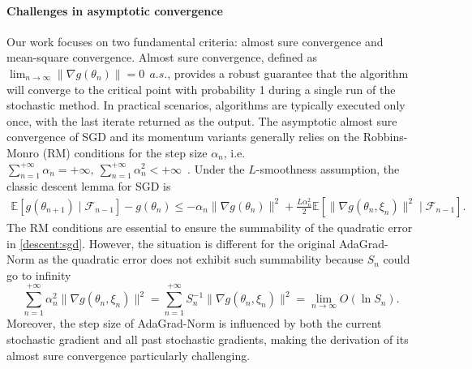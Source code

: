 \documentclass[standalone]{article}
\newcommand{\E}{\mathbb{E}}
\begin{document}
\paragraph{\textbf{Challenges in asymptotic convergence}} Our work focuses on two fundamental criteria: almost sure convergence and mean-square convergence. Almost sure convergence, defined as $\lim_{n \rightarrow \infty} \left\|\nabla g(\theta_n) \right\|=0 \ \  a.s.$, provides a robust guarantee that the algorithm will converge to the critical point with probability 1 during a single run of the stochastic method. In practical scenarios, algorithms are typically executed only once, with the last iterate returned as the output. The asymptotic almost sure convergence of SGD and its momentum variants generally relies on the Robbins-Monro (RM) conditions for the step size $\alpha_n$, i.e. $\sum_{n=1}^{+\infty}\alpha_n=+\infty,\ \sum_{n=1}^{+\infty}\alpha_n^{2}<+\infty$~\citep{robbins1971convergence,li2022unified}. 
Under the $ L$-smoothness assumption, the classic descent lemma for SGD is
\begin{align}\label{descent:sgd}
\E[g(\theta_{n+1}) \mid \mathscr{F}_{n-1}] - g(\theta_{n})\le -\alpha_{n}\|\nabla g(\theta_{n})\|^{2}+\frac{ L\alpha_{n}^{2}}{2}\E\left[\|\nabla g(\theta_{n},\xi_{n})\|^{2} \mid \mathscr{F}_{n-1}\right].
\end{align}
The RM conditions are essential to ensure the summability of the quadratic error in \eqref{descent:sgd}. However, the situation is different for the original AdaGrad-Norm as the quadratic error does not exhibit such summability because $S_n$ could go to infinity \hspace{-1in}
\begin{equation*}\sum_{n=1}^{+\infty} \alpha_n^2\|\nabla g(\theta_{n},\xi_{n})\|^{2} = \sum_{n=1}^{+\infty} S_n^{-1}\|\nabla g(\theta_{n},\xi_{n})\|^{2}= \lim_{n\rightarrow \infty}O(\ln S_{n}) .
\end{equation*}
Moreover, the step size of AdaGrad-Norm is influenced by both the current stochastic gradient and all past stochastic gradients, making the derivation of its almost sure convergence particularly challenging. %
\end{document}
